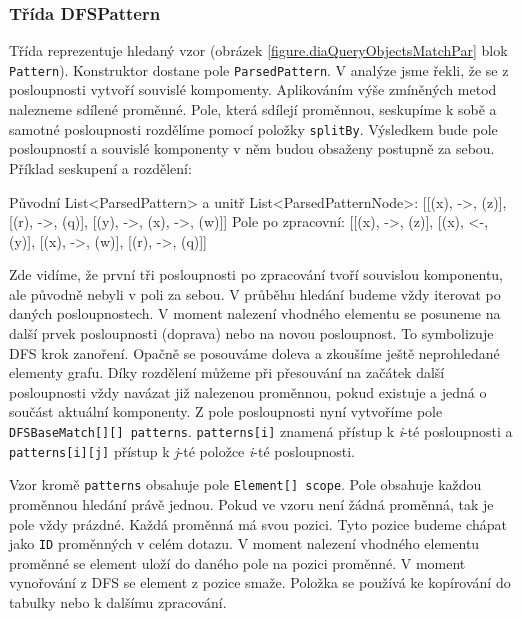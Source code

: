 \subsubsection{Třída DFSPattern}

Třída reprezentuje hledaný vzor (obrázek \ref{figure.diaQueryObjectsMatchPar} blok \texttt{Pattern}).
Konstruktor dostane pole \texttt{ParsedPattern}.
V analýze jsme řekli, že se z posloupnosti vytvoří souvislé kompomenty.
Aplikováním výše zmíněných metod nalezneme sdílené proměnné.
Pole, která sdílejí proměnnou, seskupíme k sobě a samotné posloupnosti rozdělíme pomocí položky \texttt{splitBy}.
Výsledkem bude pole posloupností a souvislé komponenty v něm budou obsaženy postupně za sebou.
Příklad seskupení a rozdělení:
\begin{code}
Původní List<ParsedPattern> a unitř List<ParsedPatternNode>:
[[(x), ->, (z)], [(r), ->, (q)], [(y), ->, (x), ->, (w)]]
Pole po zpracovní:
[[(x), ->, (z)], [(x), <-, (y)], [(x), ->, (w)], [(r), ->, (q)]]
\end{code}
Zde vidíme, že první tři posloupnosti po zpracování tvoří souvislou komponentu, ale původně nebyli v poli za sebou.
V průběhu hledání budeme vždy iterovat po daných posloupnostech.
V moment nalezení vhodného elementu se posuneme na další prvek posloupnosti (doprava) nebo na novou posloupnost.
To symbolizuje DFS krok zanoření.
Opačně se posouváme doleva a zkoušíme ještě neprohledané elementy grafu.
Díky rozdělení můžeme při přesouvání na začátek další posloupnosti vždy navázat již nalezenou proměnnou, pokud existuje a jedná o součást aktuální komponenty.
Z pole posloupnosti nyní vytvoříme pole \texttt{DFSBaseMatch[][] patterns}.
\texttt{patterns[i]} znamená přístup k \textit{i}-té posloupnosti a \texttt{patterns[i][j]} přístup k \textit{j}-té položce  \textit{i}-té posloupnosti. 

Vzor kromě \texttt{patterns} obsahuje pole \texttt{Element[] scope}.
Pole obsahuje každou proměnnou hledání právě jednou. 
Pokud ve vzoru není žádná proměnná, tak je pole vždy prázdné.
Každá proměnná má svou pozici.
Tyto pozice budeme chápat jako \texttt{ID} proměnných v celém dotazu.
V moment nalezení vhodného elementu proměnné se element uloží do daného pole na pozici proměnné.
V moment vynořování z DFS se element z pozice smaže.
Položka se používá ke kopírování do tabulky nebo k dalšímu zpracování.

